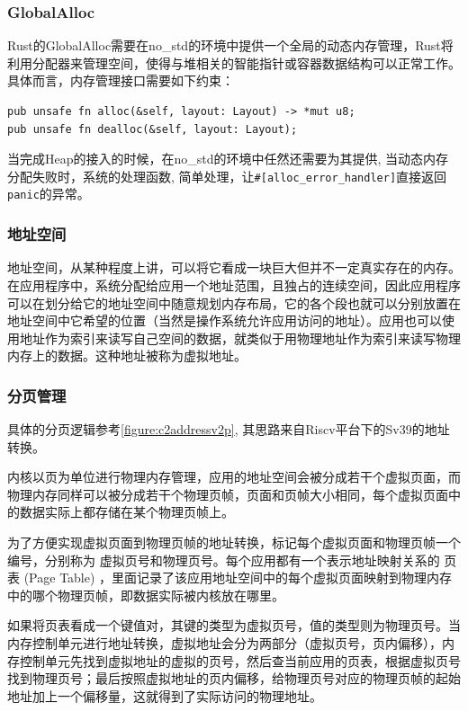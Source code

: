 \subsubsection{GlobalAlloc}
Rust的GlobalAlloc需要在no\_std的环境中提供一个全局的动态内存管理，Rust将利用分配器来管理空间，使得与堆相关的智能指针或容器数据结构可以正常工作。具体而言，内存管理接口需要如下约束：

\begin{lstlisting}[caption=GlobalAlloc的Trait约束]
pub unsafe fn alloc(&self, layout: Layout) -> *mut u8;
pub unsafe fn dealloc(&self, layout: Layout);
\end{lstlisting}

当完成Heap的接入的时候，在no\_std的环境中任然还需要为其提供, 当动态内存分配失败时，系统的处理函数, 简单处理，让\verb|#[alloc_error_handler]|直接返回\verb|panic|的异常。

\subsubsection{地址空间}

地址空间，从某种程度上讲，可以将它看成一块巨大但并不一定真实存在的内存。在应用程序中，系统分配给应用一个地址范围，且独占的连续空间，因此应用程序可以在划分给它的地址空间中随意规划内存布局，它的各个段也就可以分别放置在地址空间中它希望的位置（当然是操作系统允许应用访问的地址）。应用也可以使用地址作为索引来读写自己空间的数据，就类似于用物理地址作为索引来读写物理内存上的数据。这种地址被称为虚拟地址。


\subsubsection{分页管理}

具体的分页逻辑参考\autoref{figure:c2addressv2p}, 其思路来自Riscv平台下的Sv39的地址转换。

内核以页为单位进行物理内存管理，应用的地址空间会被分成若干个虚拟页面，而物理内存同样可以被分成若干个物理页帧，页面和页帧大小相同，每个虚拟页面中的数据实际上都存储在某个物理页帧上。

为了方便实现虚拟页面到物理页帧的地址转换，标记每个虚拟页面和物理页帧一个编号，分别称为 虚拟页号和物理页号。每个应用都有一个表示地址映射关系的 页表 (Page Table) ，里面记录了该应用地址空间中的每个虚拟页面映射到物理内存中的哪个物理页帧，即数据实际被内核放在哪里。

如果将页表看成一个键值对，其键的类型为虚拟页号，值的类型则为物理页号。当内存控制单元进行地址转换，虚拟地址会分为两部分（虚拟页号，页内偏移），内存控制单元先找到虚拟地址的虚拟的页号，然后查当前应用的页表，根据虚拟页号找到物理页号；最后按照虚拟地址的页内偏移，给物理页号对应的物理页帧的起始地址加上一个偏移量，这就得到了实际访问的物理地址。

